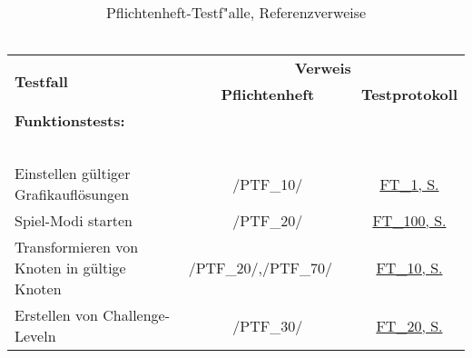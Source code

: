 \begin{longtable}{p{0.5\hsize}p{0.275\hsize}p{0.275\hsize}}

	\caption{Pflichtenheft-Testf{"a}lle, Referenzverweise\\~\\}
	\label{Pflichtenheft:Tests:Referenzverweise}
	\\


	    \multirow{2}{*}{\textbf{Testfall}}
	  & \multicolumn{2}{c}{\textbf{Verweis}}
	  
	  \\ [14pt]
	  
	  & \multicolumn{1}{c}{\textbf{Pflichtenheft}}
	  & \multicolumn{1}{c}{\textbf{Testprotokoll}}
	  
	  \\ 
	     


	  \multicolumn{3}{l}{\textbf{Funktionstests:}}
	  
	\\
	
	  \multicolumn{3}{l}{~}
	  
	\\

	  \multicolumn{1}{L{6.5cm}}{Einstellen gültiger Grafikauflösungen}
	& \multicolumn{1}{c}{/PTF\_10/}
	& \multicolumn{1}{c}{\hyperref[FT:1]{FT\_1, S. \pageref{FT:1}}}
	
	\\
	
	
	  \multicolumn{1}{L{6.5cm}}{Spiel-Modi starten}
	& \multicolumn{1}{c}{/PTF\_20/}
	& \multicolumn{1}{c}{\hyperref[FT:100]{FT\_100, S. \pageref{FT:100}}}
		
	\\

	  \multicolumn{1}{L{6.5cm}}{Transformieren von Knoten in gültige Knoten}
	& \multicolumn{1}{C{3cm}}{/PTF\_20/,\newline/PTF\_70/~~}
	& \multicolumn{1}{c}{\hyperref[FT:10]{FT\_10, S. \pageref{FT:10}}}
	
	\\
	
	 \multicolumn{1}{L{6.5cm}}{Erstellen von Challenge-Leveln}
	& \multicolumn{1}{c}{/PTF\_30/}
	& \multicolumn{1}{c}{\hyperref[FT:20]{FT\_20, S. \pageref{FT:20}}}
	
	\\
	

\end{longtable}
